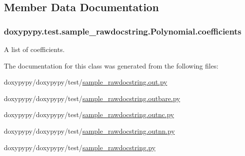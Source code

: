 \subsection{Member Data Documentation}
\hypertarget{classdoxypypy_1_1test_1_1sample__rawdocstring_1_1_polynomial_a3d89f29028329edf16bd83fedf2fd702}{
\subsubsection[{coefficients}]{\setlength{\rightskip}{0pt plus 5cm}doxypypy.\-test.\-sample\-\_\-rawdocstring.\-Polynomial.\-coefficients}}\label{classdoxypypy_1_1test_1_1sample__rawdocstring_1_1_polynomial_a3d89f29028329edf16bd83fedf2fd702}


A list of coefficients. 



The documentation for this class was generated from the following files\-:\begin{DoxyCompactItemize}
\item 
doxypypy/doxypypy/test/\hyperlink{sample__rawdocstring_8out_8py}{sample\-\_\-rawdocstring.\-out.\-py}\item 
doxypypy/doxypypy/test/\hyperlink{sample__rawdocstring_8outbare_8py}{sample\-\_\-rawdocstring.\-outbare.\-py}\item 
doxypypy/doxypypy/test/\hyperlink{sample__rawdocstring_8outnc_8py}{sample\-\_\-rawdocstring.\-outnc.\-py}\item 
doxypypy/doxypypy/test/\hyperlink{sample__rawdocstring_8outnn_8py}{sample\-\_\-rawdocstring.\-outnn.\-py}\item 
doxypypy/doxypypy/test/\hyperlink{sample__rawdocstring_8py}{sample\-\_\-rawdocstring.\-py}\end{DoxyCompactItemize}
